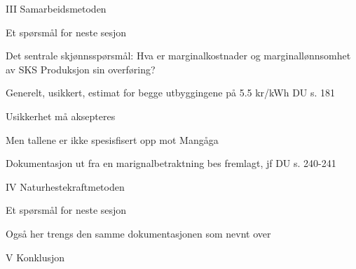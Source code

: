 \documentclass[12pt,a4paper]{article} %
\begin{document}
III	Samarbeidsmetoden

	Et spørsmål for neste sesjon

	Det sentrale skjønnsspørsmål: Hva er marginalkostnader og marginallønnsomhet av SKS Produksjon sin overføring?

	Generelt, usikkert, estimat for begge utbyggingene på 5.5 kr/kWh DU s. 181

	Usikkerhet må aksepteres	

	Men tallene er ikke spesisfisert opp mot Mangåga
	
	Dokumentasjon ut fra en marignalbetraktning bes fremlagt, jf DU s. 240-241

IV	Naturhestekraftmetoden

	Et spørsmål for neste sesjon

	Også her trengs den samme dokumentasjonen som nevnt over

V	Konklusjon
\end{document}
